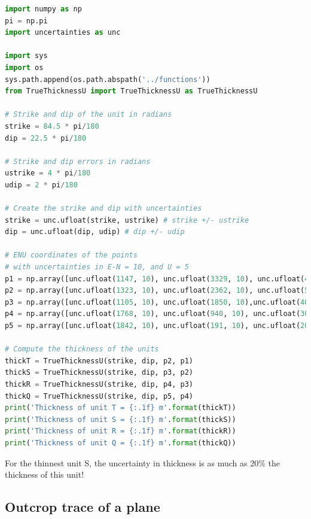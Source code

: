 \documentclass[a4paper , 12pt]{book}
\begin{document}
\begin{center}
\begin{lstlisting}[language=Python, frame=single]
import numpy as np
pi = np.pi
import uncertainties as unc

import sys
import os
sys.path.append(os.path.abspath('../functions'))
from TrueThicknessU import TrueThicknessU as TrueThicknessU

# Strike and dip of the unit in radians
strike = 84.5 * pi/180
dip = 22.5 * pi/180

# Strike and dip errors in radians
ustrike = 4 * pi/180
udip = 2 * pi/180

# Create the strike and dip with uncertainties
strike = unc.ufloat(strike, ustrike) # strike +/- ustrike
dip = unc.ufloat(dip, udip) # dip +/- udip

# ENU coordinates of the points
# with uncertainties in E-N = 10, and U = 5
p1 = np.array([unc.ufloat(1147, 10), unc.ufloat(3329, 10), unc.ufloat(400, 5)]) 
p2 = np.array([unc.ufloat(1323, 10), unc.ufloat(2362, 10), unc.ufloat(500, 5)]) 
p3 = np.array([unc.ufloat(1105, 10), unc.ufloat(1850, 10),unc.ufloat(400, 5)]) 
p4 = np.array([unc.ufloat(1768, 10), unc.ufloat(940, 10), unc.ufloat(300, 5)]) 
p5 = np.array([unc.ufloat(1842, 10), unc.ufloat(191, 10), unc.ufloat(200, 5)])

# Compute the thickness of the units
thickT = TrueThicknessU(strike, dip, p2, p1)
thickS = TrueThicknessU(strike, dip, p3, p2)
thickR = TrueThicknessU(strike, dip, p4, p3)
thickQ = TrueThicknessU(strike, dip, p5, p4) 
print('Thickness of unit T = {:.1f} m'.format(thickT))
print('Thickness of unit S = {:.1f} m'.format(thickS))
print('Thickness of unit R = {:.1f} m'.format(thickR))
print('Thickness of unit Q = {:.1f} m'.format(thickQ))
\end{lstlisting}
\end{center}

For the thinnest unit S, the uncertainty in thickness is as much as 20\% the thickness of this unit!

\subsection{Outcrop trace of a plane} \label{outcrop}
\end{document}

